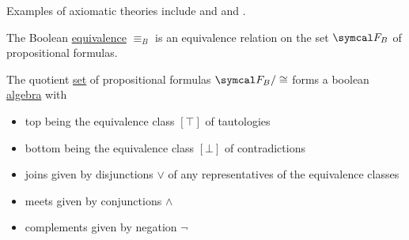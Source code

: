 \begin{example}\label{ex:axiomatic_theory}
  Examples of axiomatic theories include  and  and .
\end{example}

\begin{proposition}\label{thm:boolean_equivalence_relation}
  The Boolean \hyperref[def:propositional_interpretation]{equivalence} \( \equiv_B \) is an equivalence relation on the set \( \Cal{F}_B \) of propositional formulas.
\end{proposition}

\begin{theorem}\label{thm:propositional_logic_boolean_algebra}
  The quotient \hyperref[def:equivalence_relation]{set} of propositional formulas \( \Cal{F}_B / \cong \) forms a boolean \hyperref[def:boolean_algebra]{algebra} with
  \begin{itemize}
    \item top being the equivalence class \( [\top] \) of tautologies
    \item bottom being the equivalence class \( [\bot] \) of contradictions
    \item joins given by disjunctions \( \lor \) of any representatives of the equivalence classes
    \item meets given by conjunctions \( \land \)
    \item complements given by negation \( \neg \)
  \end{itemize}
\end{theorem}
